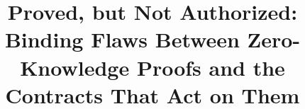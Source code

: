 \documentclass[conference,compsoc,a4paper]{IEEEtran}
\begin{document}
\title{Proved, but Not Authorized: Binding Flaws Between Zero-Knowledge Proofs and the Contracts That Act on Them}

\author{}

\maketitle

\begin{abstract}

\end{abstract}


















\appendices

\end{document}
